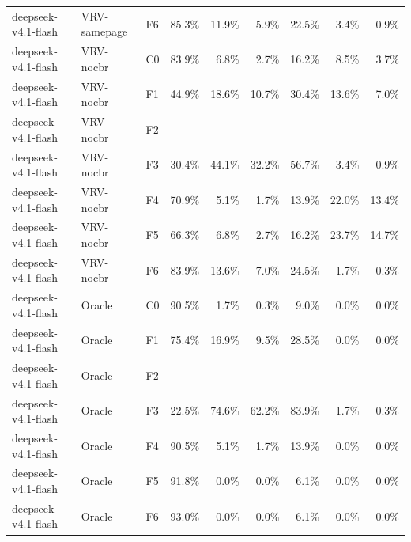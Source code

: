 \begin{tabular}{lllrrrrrr}
deepseek-v4.1-flash & VRV-samepage & F6 & 85.3\% & 11.9\% & 5.9\% & 22.5\% & 3.4\% & 0.9\% \\
deepseek-v4.1-flash & VRV-nocbr & C0 & 83.9\% & 6.8\% & 2.7\% & 16.2\% & 8.5\% & 3.7\% \\
deepseek-v4.1-flash & VRV-nocbr & F1 & 44.9\% & 18.6\% & 10.7\% & 30.4\% & 13.6\% & 7.0\% \\
deepseek-v4.1-flash & VRV-nocbr & F2 & -- & -- & -- & -- & -- & -- \\
deepseek-v4.1-flash & VRV-nocbr & F3 & 30.4\% & 44.1\% & 32.2\% & 56.7\% & 3.4\% & 0.9\% \\
deepseek-v4.1-flash & VRV-nocbr & F4 & 70.9\% & 5.1\% & 1.7\% & 13.9\% & 22.0\% & 13.4\% \\
deepseek-v4.1-flash & VRV-nocbr & F5 & 66.3\% & 6.8\% & 2.7\% & 16.2\% & 23.7\% & 14.7\% \\
deepseek-v4.1-flash & VRV-nocbr & F6 & 83.9\% & 13.6\% & 7.0\% & 24.5\% & 1.7\% & 0.3\% \\
deepseek-v4.1-flash & Oracle & C0 & 90.5\% & 1.7\% & 0.3\% & 9.0\% & 0.0\% & 0.0\% \\
deepseek-v4.1-flash & Oracle & F1 & 75.4\% & 16.9\% & 9.5\% & 28.5\% & 0.0\% & 0.0\% \\
deepseek-v4.1-flash & Oracle & F2 & -- & -- & -- & -- & -- & -- \\
deepseek-v4.1-flash & Oracle & F3 & 22.5\% & 74.6\% & 62.2\% & 83.9\% & 1.7\% & 0.3\% \\
deepseek-v4.1-flash & Oracle & F4 & 90.5\% & 5.1\% & 1.7\% & 13.9\% & 0.0\% & 0.0\% \\
deepseek-v4.1-flash & Oracle & F5 & 91.8\% & 0.0\% & 0.0\% & 6.1\% & 0.0\% & 0.0\% \\
deepseek-v4.1-flash & Oracle & F6 & 93.0\% & 0.0\% & 0.0\% & 6.1\% & 0.0\% & 0.0\% \\
\bottomrule
\end{tabular}

